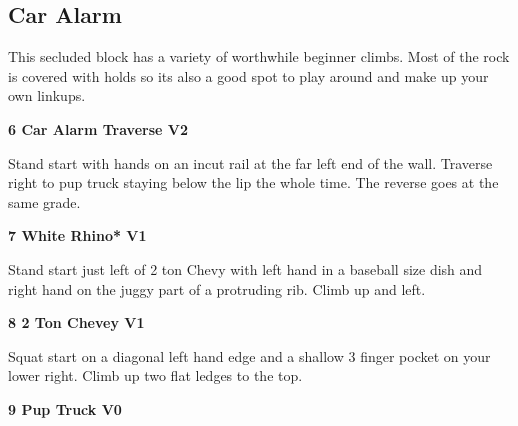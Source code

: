 \begin{multicols}{2}
			\subsection*{Car Alarm}\label{bf:Car Alarm}
			\begin{minipage}{\columnwidth}
			This secluded block has a variety of worthwhile beginner climbs. Most of the rock is covered with holds so its also a good spot to play around and make up your own linkups.
			\end{minipage}
			

					\begin{minipage}{\linewidth}	
					\label{rt:Car Alarm Traverse}
\colorbox{green!20}{
\parbox{0.95\textwidth}{
\textbf{
6 Car Alarm Traverse V2    
}
}
}

					\begin{adjustwidth}{0.5cm}{}				
					Stand start with hands on an incut rail at the far left end of the wall. Traverse right to pup truck staying below the lip the whole time. The reverse goes at the same grade.
					\end{adjustwidth}
					\end{minipage}
					\begin{minipage}{\linewidth}	
					\label{rt:White Rhino}
\colorbox{green!20}{
\parbox{0.95\textwidth}{
\textbf{
7 White Rhino* V1   
}
}
}

					\begin{adjustwidth}{0.5cm}{}				
					Stand start just left of 2 ton Chevy with left hand in a baseball size dish and right hand on the juggy part of a protruding rib. Climb up and left.
					\end{adjustwidth}
					\end{minipage}
					\begin{minipage}{\linewidth}	
					\label{rt:2 Ton Chevey}
\colorbox{green!20}{
\parbox{0.95\textwidth}{
\textbf{
8 2 Ton Chevey V1    
}
}
}

					\begin{adjustwidth}{0.5cm}{}				
					Squat start on a diagonal left hand edge and a shallow 3 finger pocket on your lower right. Climb up two flat ledges to the top.
					\end{adjustwidth}
					\end{minipage}
					\begin{minipage}{\linewidth}	
					\label{rt:Pup Truck}
\colorbox{green!20}{
\parbox{0.95\textwidth}{
\textbf{
9 Pup Truck V0    
}
}
}


\end{minipage}
\end{multicols}
